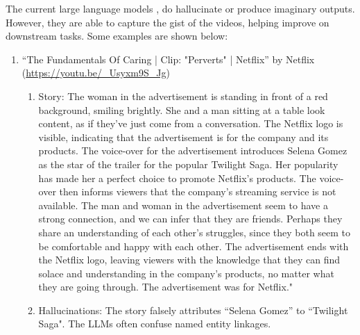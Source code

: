 \documentclass[hidelinks,11pt,a4paper]{report}
\begin{document}
The current large language models , do hallucinate or produce imaginary outputs. However, they are able to capture the gist of the videos, helping improve on downstream tasks. Some examples are shown below:

\begin{enumerate}
    \item ``The Fundamentals Of Caring | Clip: "Perverts" | Netflix'' by Netflix (\url{https://youtu.be/_Usyxm9S_Jg})
    \begin{enumerate}
        \item Story: The woman in the advertisement is standing in front of a red background, smiling brightly. She and a man sitting at a table look content, as if they've just come from a conversation. The Netflix logo is visible, indicating that the advertisement is for the company and its products. The voice-over for the advertisement introduces Selena Gomez as the star of the trailer for the popular Twilight Saga. Her popularity has made her a perfect choice to promote Netflix's products. The voice-over then informs viewers that the company's streaming service is not available. The man and woman in the advertisement seem to have a strong connection, and we can infer that they are friends. Perhaps they share an understanding of each other's struggles, since they both seem to be comfortable and happy with each other. The advertisement ends with the Netflix logo, leaving viewers with the knowledge that they can find solace and understanding in the company's products, no matter what they are going through. The advertisement was for Netflix."

        \item Hallucinations: The story falsely attributes ``Selena Gomez'' to ``Twilight Saga". The LLMs often confuse named entity linkages.
    \end{enumerate}


\end{enumerate}
\end{document}
